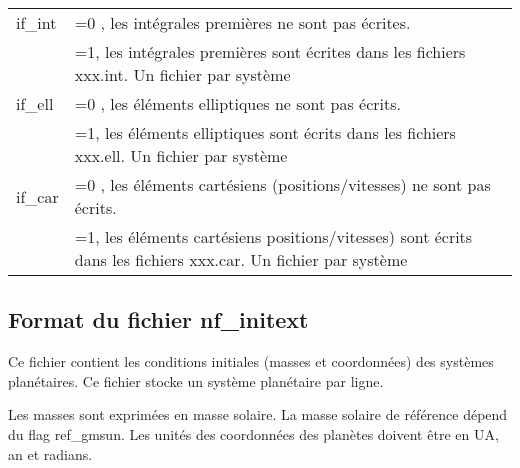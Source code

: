 \documentclass[11pt]{article}
\begin{document}
\begin{tabularx}{\textwidth}{|l|X|}
 if\_int & =0 , les int\'egrales premi\`eres ne sont pas \'ecrites.\\
&=1, les int\'egrales premi\`eres sont \'ecrites dans les fichiers xxx.int. Un fichier par syst\`eme\\ \hline
 
 if\_ell & =0 , les \'el\'ements elliptiques ne sont pas \'ecrits.\\
&=1, les \'el\'ements elliptiques sont \'ecrits dans les fichiers xxx.ell. Un fichier par syst\`eme\\ \hline
 
 if\_car &  =0 , les \'el\'ements cart\'esiens (positions/vitesses) ne sont pas \'ecrits.\\
&=1, les \'el\'ements cart\'esiens positions/vitesses) sont \'ecrits dans les fichiers xxx.car. Un fichier par syst\`eme\\ \hline 
 \end{tabularx}



\subsection{Format du fichier nf\_initext}

Ce fichier contient les conditions initiales (masses et coordonn\'ees) des syst\`emes plan\'etaires. 
Ce fichier stocke un syst\`eme plan\'etaire par ligne.

Les masses sont exprimées en masse solaire.  La masse solaire de référence dépend du flag ref\_gmsun. 
Les unit\'es des coordonn\'ees des plan\`etes doivent \^etre en UA, an et radians.
\end{document}

